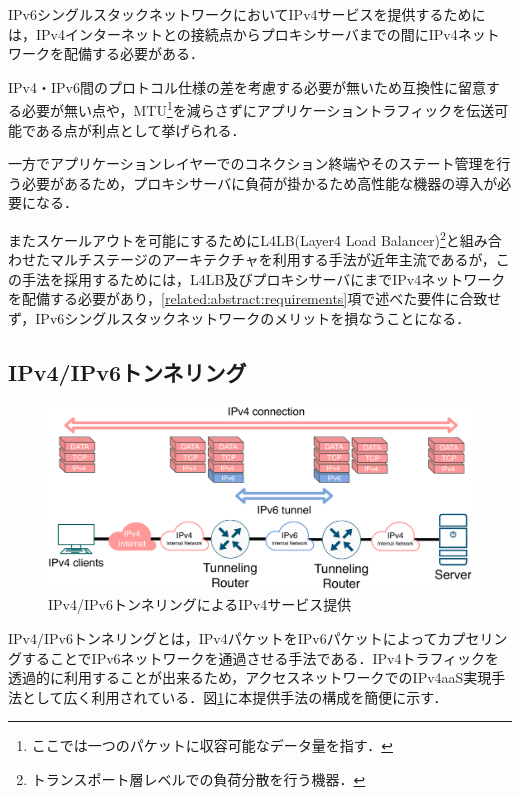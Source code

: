 IPv6シングルスタックネットワークにおいてIPv4サービスを提供するためには，IPv4インターネットとの接続点からプロキシサーバまでの間にIPv4ネットワークを配備する必要がある．

IPv4・IPv6間のプロトコル仕様の差を考慮する必要が無いため互換性に留意する必要が無い点や，MTU\footnote{ここでは一つのパケットに収容可能なデータ量を指す．}を減らさずにアプリケーショントラフィックを伝送可能である点が利点として挙げられる．

一方でアプリケーションレイヤーでのコネクション終端やそのステート管理を行う必要があるため，プロキシサーバに負荷が掛かるため高性能な機器の導入が必要になる．

またスケールアウトを可能にするためにL4LB(Layer4 Load Balancer)\footnote{トランスポート層レベルでの負荷分散を行う機器．}と組み合わせたマルチステージのアーキテクチャを利用する手法が近年主流であるが\cite{Facebook_LB, Google_LB}，この手法を採用するためには，L4LB及びプロキシサーバにまでIPv4ネットワークを配備する必要があり，\ref{related:abstract:requirements}項で述べた要件に合致せず，IPv6シングルスタックネットワークのメリットを損なうことになる．



\subsection{IPv4/IPv6トンネリング}
\begin{figure}[h]
    \begin{center}
      \includegraphics[width=15cm,pagebox=cropbox,clip]{img/Tunneling_model.pdf}
    \end{center}
    \caption{IPv4/IPv6トンネリングによるIPv4サービス提供}
    \label{fig:tunneling_model}
\end{figure}

IPv4/IPv6トンネリングとは，IPv4パケットをIPv6パケットによってカプセリングすることでIPv6ネットワークを通過させる手法である．IPv4トラフィックを透過的に利用することが出来るため，アクセスネットワークでのIPv4aaS実現手法として広く利用されている\cite{RFC8585}．図\ref{fig:tunneling_model}に本提供手法の構成を簡便に示す．


